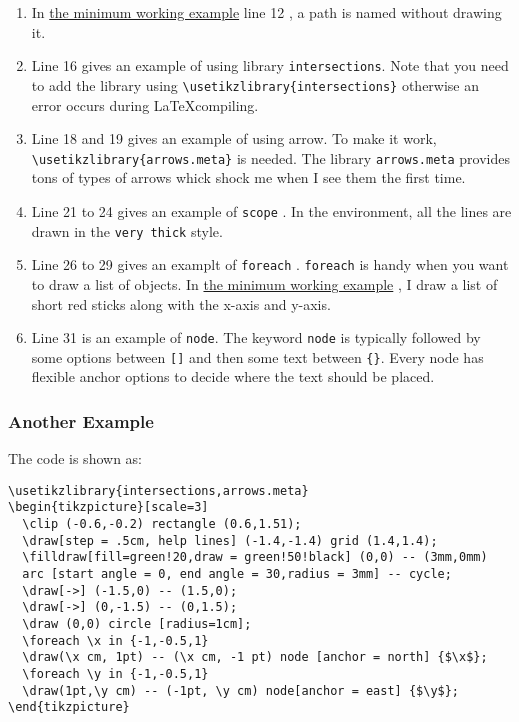 \documentclass[koma,utopia,a4paper,captions=tableheading,11pt,listings-sv,microtype,paralist,colorlinks=true,urlcolor=blue]{org-article}
\begin{document}
\begin{enumerate}
\item In \hyperref[a-minimum-working-example]{the minimum working example} line 12 , a path is named  without drawing
it.
\item Line 16 gives an example of using library \texttt{intersections}. Note
that you need to add the library using \texttt{\textbackslash{}usetikzlibrary\{intersections\}}
otherwise an error occurs during \LaTeX compiling.
\item Line 18 and 19 gives an example of using arrow. To make it work,
\texttt{\textbackslash{}usetikzlibrary\{arrows.meta\}} is needed. The library \texttt{arrows.meta} provides tons
of types of arrows whick shock me when I see them the first time.
\item Line 21 to 24 gives an example of \texttt{scope} . In the environment, all
the lines are drawn in the \texttt{very thick} style.
\item Line 26 to 29 gives an examplt of \texttt{foreach} . \texttt{foreach} is handy
when you want to draw a list of objects. In \hyperref[a-minimum-working-example]{the minimum working example} , I
draw a list of short red sticks along with the x-axis and y-axis.
\item Line 31 is an example of \texttt{node}. The keyword \texttt{node} is typically followed by
some options between \texttt{[]} and then some text between \texttt{\{\}}. Every node has flexible
anchor options to decide where the text should be placed.
\end{enumerate}
\subsubsection{Another Example}
\label{sec:orgbc1168b}


The code is shown as:
\begin{lstlisting}
\usetikzlibrary{intersections,arrows.meta}
\begin{tikzpicture}[scale=3]
  \clip (-0.6,-0.2) rectangle (0.6,1.51);
  \draw[step = .5cm, help lines] (-1.4,-1.4) grid (1.4,1.4);
  \filldraw[fill=green!20,draw = green!50!black] (0,0) -- (3mm,0mm)
  arc [start angle = 0, end angle = 30,radius = 3mm] -- cycle;
  \draw[->] (-1.5,0) -- (1.5,0);
  \draw[->] (0,-1.5) -- (0,1.5);
  \draw (0,0) circle [radius=1cm];
  \foreach \x in {-1,-0.5,1}
  \draw(\x cm, 1pt) -- (\x cm, -1 pt) node [anchor = north] {$\x$};
  \foreach \y in {-1,-0.5,1}
  \draw(1pt,\y cm) -- (-1pt, \y cm) node[anchor = east] {$\y$};
\end{tikzpicture}
\end{lstlisting}
\end{document}

